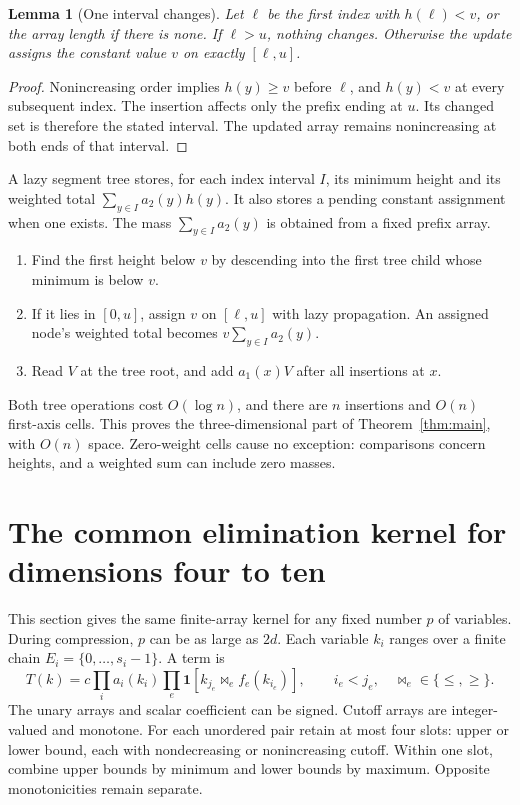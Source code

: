 \documentclass[12pt,a4paper]{article}
\newtheorem{lemma}[theorem]{Lemma}
\newcommand{\1}{\mathbf1}
\begin{document}
\begin{lemma}[One interval changes]
Let $\ell$ be the first index with $h(\ell)<v$, or the array length if
there is none. If $\ell>u$, nothing changes. Otherwise the update assigns
the constant value $v$ on exactly $[\ell,u]$.
\end{lemma}
\begin{proof}
Nonincreasing order implies $h(y)\ge v$ before $\ell$, and $h(y)<v$
at every subsequent index. The insertion affects only the prefix ending
at $u$. Its changed set is therefore the stated interval. The updated
array remains nonincreasing at both ends of that interval.
\end{proof}

A lazy segment tree stores, for each index interval $I$, its minimum
height and its weighted total $\sum_{y\in I}a_2(y)h(y)$. It also stores
a pending constant assignment when one exists. The mass
$\sum_{y\in I}a_2(y)$ is obtained from a fixed prefix array.
\begin{enumerate}
\item Find the first height below $v$ by descending into the first tree
child whose minimum is below $v$.
\item If it lies in $[0,u]$, assign $v$ on $[\ell,u]$ with lazy propagation.
An assigned node's weighted total becomes $v\sum_{y\in I}a_2(y)$.
\item Read $V$ at the tree root, and add $a_1(x)V$ after all insertions at $x$.
\end{enumerate}
Both tree operations cost $O(\log n)$, and there are $n$ insertions and
$O(n)$ first-axis cells. This proves the three-dimensional part of
Theorem~\ref{thm:main}, with $O(n)$ space.
Zero-weight cells cause no exception: comparisons concern heights,
and a weighted sum can include zero masses.

\section{The common elimination kernel for dimensions four to ten}
This section gives the same finite-array kernel for any fixed number
$p$ of variables. During compression, $p$ can be as large as $2d$.
Each variable $k_i$ ranges over a finite chain
$E_i=\{0,\ldots,s_i-1\}$. A term is
\begin{equation}
T(k)=c\prod_i a_i(k_i)\prod_e\1[k_{j_e}\mathrel{\bowtie_e}f_e(k_{i_e})],
\qquad i_e<j_e,\quad\bowtie_e\in\{\le,\ge\}. \label{eq:term}
\end{equation}
The unary arrays and scalar coefficient can be signed. Cutoff arrays are
integer-valued and monotone. For each unordered pair retain at most four
slots: upper or lower bound, each with nondecreasing or nonincreasing
cutoff. Within one slot, combine upper bounds by minimum and lower bounds
by maximum. Opposite monotonicities remain separate.
\end{document}
